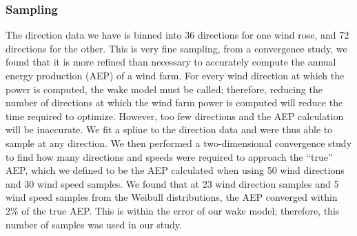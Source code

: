 \subsubsection{Sampling}
The direction data we have is binned into 36 directions for one wind rose, and 72 directions for the other. This is very fine sampling,
from a convergence study, we found that it is more refined than necessary to accurately compute the annual energy production (AEP) of a wind farm. 
For every wind direction at which the power is computed, the wake model must be called; therefore, reducing the number of directions at which the wind farm power is computed will reduce the time required to optimize. 
However, too few directions and the AEP calculation will be inaccurate. We fit a spline to the direction data and were thus able to sample at any direction. We then performed a two-dimensional convergence study to find how many directions and speeds were required to approach the ``true'' AEP, which we defined to be the AEP calculated when using 50 wind directions and 30 wind speed samples. 
We found that at 23 wind direction samples and 5 wind speed samples from the Weibull distributions, the AEP converged within 2\% of the true AEP. This is within the error of our wake model; therefore, this number of samples was used in our study. 
